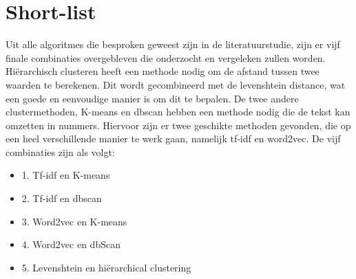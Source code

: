 \section{Short-list}
Uit alle algoritmes die besproken geweest zijn in de literatuurstudie, zijn er vijf finale combinaties overgebleven die onderzocht en vergeleken zullen worden. Hiërarchisch clusteren heeft een methode nodig om de afstand tussen twee waarden te berekenen. Dit wordt gecombineerd met de levenshtein distance, wat een goede en eenvoudige manier is om dit te bepalen. De twee andere clustermethoden, K-means en dbscan hebben een methode nodig die de tekst kan omzetten in nummers. Hiervoor zijn er twee geschikte methoden gevonden, die op een heel verschillende manier te werk gaan, namelijk tf-idf en word2vec. De vijf combinaties zijn als volgt:
\begin{itemize}
    \item1. Tf-idf en K-means
    \item2. Tf-idf en dbscan
    \item3. Word2vec en K-means
    \item4. Word2vec en dbScan
    \item5. Levenshtein en hiërarchical clustering
\end{itemize}

